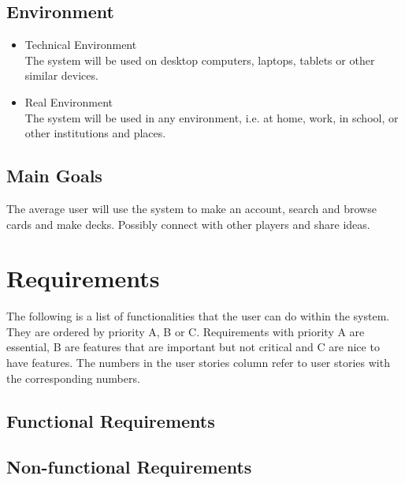 \documentclass[paper=a4, fontsize=11pt]{scrartcl} %
\numberwithin{equation}{section} %
\numberwithin{figure}{section} %
\numberwithin{table}{section} %
\begin{document}
\subsection{Environment}
\begin{itemize}
  \item Technical Environment \\
  The system will be used on desktop computers, laptops, tablets or other similar devices.
  \item Real Environment \\
  The system will be used in any environment, i.e. at home, work, in school, or other institutions and places.
\end{itemize}
\subsection{Main Goals}
The average user will use the system to make an account, search and browse cards and make decks. Possibly connect with other players and share ideas.

\clearpage

\section{Requirements}
The following is a list of functionalities that the user can do within the system. They are ordered by priority A, B or C. Requirements with priority A are essential, B are features that are important but not critical and C are nice to have features. The numbers in the user stories column refer to user stories with the corresponding numbers.
\subsection{Functional Requirements}
\begin{center}
\end{center}
\subsection{Non-functional Requirements}
\begin{center}
\end{center}
\end{document}
